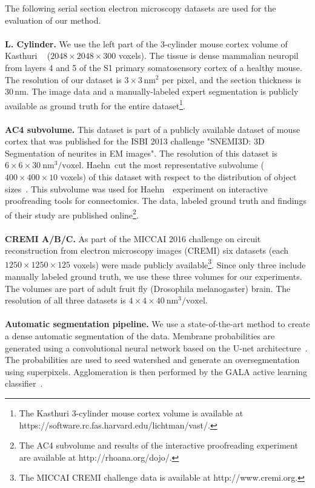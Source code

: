 The following serial section electron microscopy datasets are used for the evaluation of our method. 
\\~\\
\textbf{L. Cylinder.} We use the left part of the 3-cylinder mouse cortex volume of Kasthuri \etal~\cite{kasthuri2015saturated} ($2048\times2048\times300$ voxels). The tissue is dense mammalian neuropil from layers 4 and 5 of the S1 primary somatosensory cortex of a healthy mouse. The resolution of our dataset is $3\times3\, \text{nm}^2$ per pixel, and the section thickness is $30\, \text{nm}$. The image data and a manually-labeled expert segmentation is publicly available as ground truth for the entire dataset\footnote{The Kasthuri 3-cylinder mouse cortex volume is available at  https://software.rc.fas.harvard.edu/lichtman/vast/.}.
\\~\\
\textbf{AC4 subvolume.} This dataset is part of a publicly available dataset of mouse cortex that was published for the ISBI 2013 challenge "SNEMI3D: 3D Segmentation of neurites in EM images". The resolution of this dataset is $6\times6\times30~\text{nm}^3\text{/voxel}$. Haehn~\etal cut the most representative subvolume ($400\times400\times10$ voxels) of this dataset with respect to the distribution of object sizes~\cite{haehn_dojo_2014}. This subvolume was used for Haehn~\etal~experiment on interactive proofreading tools for connectomics. The data, labeled ground truth and findings of their study are published online\footnote{The AC4 subvolume and results of the interactive proofreading experiment are available at http://rhoana.org/dojo/.}. 
\\~\\
\textbf{CREMI A/B/C.} As part of the MICCAI 2016 challenge on circuit reconstruction from electron microscopy images (CREMI) six datasets (each $1250\times1250\times125$ voxels) were made publicly available\footnote{The MICCAI CREMI challenge data is available at http://www.cremi.org.}. Since only three include manually labeled ground truth, we use these three volumes for our experiments. The volumes are part of adult fruit fly (Drosophila melanogaster) brain. The resolution of all three datasets is $4\times4\times40~\text{nm}^3\text{/voxel}$. 
\\~\\
\textbf{Automatic segmentation pipeline.}
We use a state-of-the-art method to create a dense automatic segmentation of the data. Membrane probabilities are generated using a convolutional neural network based on the U-net architecture~\cite{RonnebergerFB15}. The probabilities are used to seed watershed and generate an oversegmentation using superpixels. Agglomeration is then performed by the GALA active learning classifier~\cite{nunez2014graph}.

